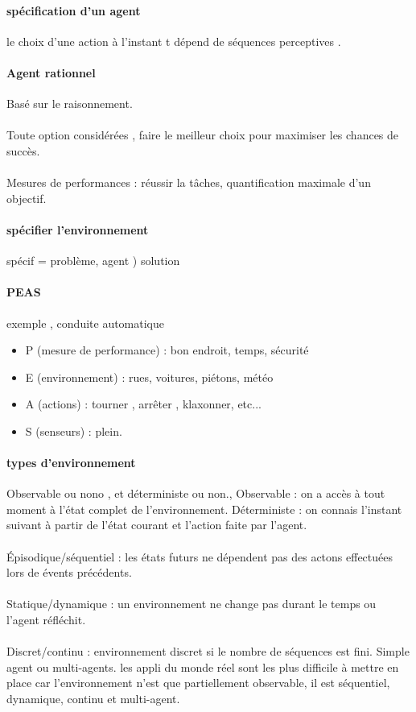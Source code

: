 \documentclass{article}
\begin{document}
\paragraph{spécification d'un agent} le choix d'une action à l'instant t dépend de séquences perceptives .
\paragraph{Agent rationnel}Basé sur le raisonnement.\\\\Toute option considérées , faire le meilleur choix pour maximiser les chances de succès.\\\\Mesures de performances : réussir la tâches, quantification maximale d'un objectif.
\paragraph{spécifier l'environnement}
 spécif = problème, agent ) solution
\paragraph{PEAS} exemple , conduite automatique 
\begin{itemize}
\item P (mesure de performance) : bon endroit, temps, sécurité
\item E (environnement) : rues, voitures, piétons, météo
\item A (actions) : tourner , arrêter , klaxonner, etc...
\item S (senseurs) : plein.
\end{itemize}

\paragraph{types d'environnement} 
Observable ou nono , et déterministe ou non., Observable : on a accès à tout moment à l'état complet de l'environnement. Déterministe : on connais l'instant suivant à partir de l'état courant et l'action faite par l'agent.\\\\Épisodique/séquentiel : les états futurs ne dépendent pas des actons effectuées lors de évents précédents.\\\\Statique/dynamique : un environnement ne change pas durant le temps ou l'agent réfléchit.\\\\Discret/continu : environnement discret si le nombre de séquences est fini. Simple agent ou multi-agents. les appli du monde réel sont les plus difficile à mettre en place car l'environnement n’est que partiellement observable, il est séquentiel, dynamique, continu et multi-agent.
\newpage
\end{document}
